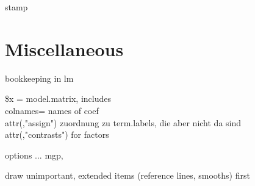 \documentclass[11pt]{article}
\begin{document}
stamp

\section{Miscellaneous}
\Itm
bookkeeping in lm

\$x = model.matrix, includes\\
  colnames= names of coef\\
  attr(,"assign") zuordnung zu term.labels, die aber nicht da sind\\
  attr(,"contrasts") for factors

\Itm
options ... mgp, 

\Itm
draw unimportant, extended items (reference lines, smooths) first
\end{document}
